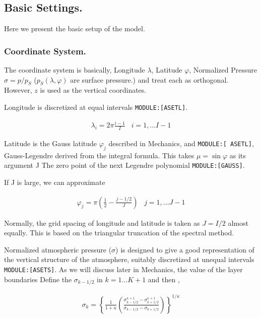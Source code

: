 \hypertarget{basic-settings.}{%
\subsection{Basic Settings.}\label{basic-settings.}}

Here we present the basic setup of the model.

\hypertarget{coordinate-system.}{%
\subsubsection{Coordinate System.}\label{coordinate-system.}}

The coordinate system is basically, Longitude \(\lambda\), Latitude
\(\varphi\), Normalized Pressure \(\sigma = p/p_S\)
(\(p_S(\lambda,\varphi)\) are surface pressure.) and treat each as
orthogonal. However, \(z\) is used as the vertical coordinates.

Longitude is discretized at equal intervals \texttt{MODULE:{[}ASETL{]}}.

\begin{eqnarray}
  \lambda_i = 2 \pi \frac{i-1}{I}  \;\;\; i = 1, \ldots I-1
\end{eqnarray}

Latitude is the Gauss latitude \(\varphi_j\) described in Mechanics, and
\texttt{MODULE:{[}\ ASETL{]}}, Gauss-Legendre derived from the integral
formula. This takes \(\mu = \sin \varphi\) as its argument J The zero
point of the next Legendre polynomial \texttt{MODULE:{[}GAUSS{]}}.

If J is large, we can approximate

\begin{eqnarray}
  \varphi_j =  \pi ( \frac{1}{2}- \frac{j-1/2}{J} ) \;\;\; j = 1, \ldots J-1
\end{eqnarray}

Normally, the grid spacing of longitude and latitude is taken as
\(J = I/2\) almost equally. This is based on the triangular truncation
of the spectral method.

Normalized atmospheric pressure (\(\sigma\)) is designed to give a good
representation of the vertical structure of the atmosphere, suitably
discretized at unequal intervals \texttt{MODULE:{[}ASETS{]}}. As we will
discuss later in Mechanics, the value of the layer boundaries Define the
\(\sigma_{k-1/2}\) in \(k = 1 \ldots K+1\) and then ,

\begin{eqnarray}
 \sigma_k = \left\{ \frac{1}{1+\kappa}
                     \left( \frac{  \sigma^{\kappa +1}_{k-1/2}
                                  - \sigma^{\kappa +1}_{k+1/2}      }
                                  { \sigma_{k-1/2} - \sigma_{k+1/2} }
                     \right)
              \right\}^{1/\kappa}
\end{eqnarray}

